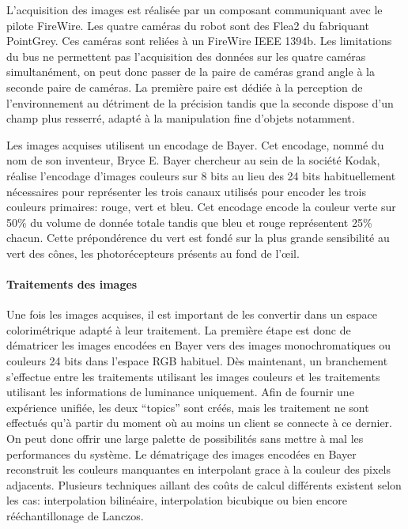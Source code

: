 L'acquisition des images est réalisée par un composant communiquant
avec le pilote FireWire. Les quatre caméras du robot sont des Flea2 du
fabriquant PointGrey. Ces caméras sont reliées à un FireWire
IEEE 1394b. Les limitations du bus ne permettent pas l'acquisition des
données sur les quatre caméras simultanément, on peut donc passer de
la paire de caméras grand angle à la seconde paire de caméras. La
première paire est dédiée à la perception de l'environnement au
détriment de la précision tandis que la seconde dispose d'un champ
plus resserré, adapté à la manipulation fine d'objets notamment.

Les images acquises utilisent un encodage de Bayer. Cet encodage,
nommé du nom de son inventeur, Bryce E. Bayer chercheur au sein de la
société Kodak, réalise l'encodage d'images couleurs sur 8 bits au lieu
des 24 bits habituellement nécessaires pour représenter les trois
canaux utilisés pour encoder les trois couleurs primaires: rouge, vert
et bleu. Cet encodage encode la couleur verte sur 50\% du volume de
donnée totale tandis que bleu et rouge représentent 25\% chacun. Cette
prépondérence du vert est fondé sur la plus grande sensibilité au vert
des cônes, les photorécepteurs présents au fond de l'\oe il.


\paragraph{Traitements des images}

Une fois les images acquises, il est important de les convertir dans
un espace colorimétrique adapté à leur traitement. La première étape
est donc de dématricer les images encodées en Bayer vers des images
monochromatiques ou couleurs 24 bits dans l'espace RGB habituel. Dès
maintenant, un branchement s'effectue entre les traitements utilisant
les images couleurs et les traitements utilisant les informations de
luminance uniquement. Afin de fournir une expérience unifiée, les deux
``topics'' sont créés, mais les traitement ne sont effectués qu'à
partir du moment où au moins un client se connecte à ce dernier. On
peut donc offrir une large palette de possibilités sans mettre à mal
les performances du système. Le dématriçage des images encodées en
Bayer reconstruit les couleurs manquantes en interpolant grace à la
couleur des pixels adjacents. Plusieurs techniques aillant des coûts
de calcul différents existent selon les cas: interpolation bilinéaire,
interpolation bicubique ou bien encore rééchantillonage de Lanczos.


